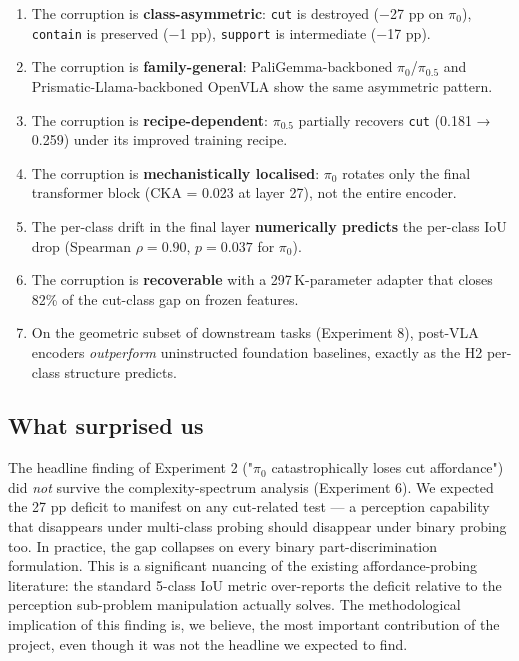 \documentclass[11pt]{article}
\begin{document}
\begin{enumerate}[leftmargin=1.3em, itemsep=0.2em, topsep=0.2em]
\item The corruption is \textbf{class-asymmetric}: \texttt{cut} is
destroyed ($-$27 pp on $\pi_0$), \texttt{contain} is preserved ($-$1 pp),
\texttt{support} is intermediate ($-$17 pp).
\item The corruption is \textbf{family-general}: PaliGemma-backboned
$\pi_0$/$\pi_{0.5}$ and Prismatic-Llama-backboned OpenVLA show the
same asymmetric pattern.
\item The corruption is \textbf{recipe-dependent}: $\pi_{0.5}$
partially recovers \texttt{cut} (0.181 → 0.259) under its improved
training recipe.
\item The corruption is \textbf{mechanistically localised}: $\pi_0$
rotates only the final transformer block (CKA = 0.023 at layer 27),
not the entire encoder.
\item The per-class drift in the final layer \textbf{numerically
predicts} the per-class IoU drop (Spearman $\rho = 0.90$, $p = 0.037$
for $\pi_0$).
\item The corruption is \textbf{recoverable} with a 297\,K-parameter
adapter that closes 82\% of the cut-class gap on frozen features.
\item On the geometric subset of downstream tasks
(Experiment 8), post-VLA encoders \emph{outperform} uninstructed
foundation baselines, exactly as the H2 per-class structure predicts.
\end{enumerate}

\subsection{What surprised us}

The headline finding of Experiment 2 ("$\pi_0$ catastrophically loses
cut affordance") did \emph{not} survive the complexity-spectrum
analysis (Experiment 6). We expected the 27 pp deficit to manifest on
any cut-related test --- a perception capability that disappears under
multi-class probing should disappear under binary probing too. In
practice, the gap collapses on every binary part-discrimination
formulation. This is a significant nuancing of the existing
affordance-probing literature: the standard 5-class IoU metric over-reports
the deficit relative to the perception sub-problem manipulation actually
solves. The methodological implication of this finding is, we believe,
the most important contribution of the project, even though it was not
the headline we expected to find.
\end{document}
